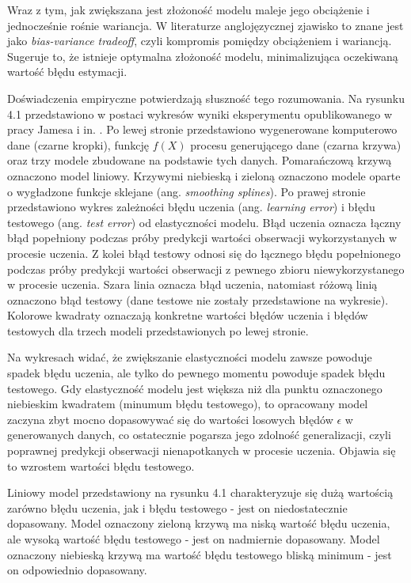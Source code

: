\documentclass[notitlepage]{report}
\begin{document}
Wraz z tym, jak zwiększana jest złożoność modelu maleje jego obciążenie i jednocześnie rośnie wariancja. W literaturze anglojęzycznej zjawisko to znane jest jako \textit{bias-variance tradeoff}, czyli kompromis pomiędzy obciążeniem i wariancją. Sugeruje to, że istnieje optymalna złożoność modelu, minimalizująca oczekiwaną wartość błędu estymacji. 

Doświadczenia empiryczne potwierdzają słuszność tego rozumowania. Na rysunku 4.1 przedstawiono w postaci wykresów wyniki eksperymentu opublikowanego w pracy Jamesa i in. \cite{islr}. Po lewej stronie przedstawiono wygenerowane komputerowo dane (czarne kropki), funkcję $f(X)$ procesu generującego dane (czarna krzywa) oraz trzy modele zbudowane na podstawie tych danych. Pomarańczową krzywą oznaczono model liniowy. Krzywymi niebieską i zieloną oznaczono modele oparte o wygładzone funkcje sklejane (ang. \textit{smoothing splines}). Po prawej stronie przedstawiono wykres zależności błędu uczenia (ang. \textit{learning error}) i błędu testowego (ang. \textit{test error}) od elastyczności modelu. Błąd uczenia oznacza łączny błąd popełniony podczas próby predykcji wartości obserwacji wykorzystanych w procesie uczenia. Z kolei błąd testowy odnosi się do łącznego błędu popełnionego podczas próby predykcji wartości obserwacji z pewnego zbioru niewykorzystanego w procesie uczenia.  Szara linia oznacza błąd uczenia, natomiast różową linią oznaczono błąd testowy (dane testowe nie zostały przedstawione na wykresie). Kolorowe kwadraty oznaczają konkretne wartości błędów uczenia i błędów testowych dla trzech modeli przedstawionych po lewej stronie.

Na wykresach widać, że zwiększanie elastyczności modelu zawsze powoduje spadek błędu uczenia, ale tylko do pewnego momentu powoduje spadek błędu testowego. Gdy elastyczność modelu jest większa niż dla punktu oznaczonego niebieskim kwadratem (minumum błędu testowego), to opracowany model zaczyna zbyt mocno dopasowywać się do wartości losowych błędów $\epsilon$ w generowanych danych, co ostatecznie pogarsza jego zdolność generalizacji, czyli poprawnej predykcji obserwacji nienapotkanych w procesie uczenia. Objawia się to wzrostem wartości błędu testowego.

Liniowy model przedstawiony na rysunku 4.1 charakteryzuje się dużą wartością zarówno błędu uczenia, jak i błędu testowego - jest on niedostatecznie dopasowany. Model oznaczony zieloną krzywą ma niską wartość błędu uczenia, ale wysoką wartość błędu testowego - jest on nadmiernie dopasowany. Model oznaczony niebieską krzywą ma wartość błędu testowego bliską minimum - jest on odpowiednio dopasowany. 
\end{document}

